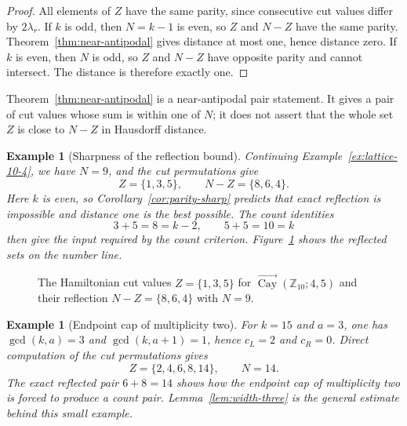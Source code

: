 \documentclass[11pt]{article}
\newtheorem{example}[theorem]{Example}
\newcommand{\Cay}{\overrightarrow{\operatorname{Cay}}}
\newcommand{\Z}{\mathbb Z}
\begin{document}
\begin{proof}
All elements of $Z$ have the same parity, since consecutive cut values differ by $2\lambda_r$.  If $k$ is odd, then $N=k-1$ is even, so $Z$ and $N-Z$ have the same parity.  Theorem~\ref{thm:near-antipodal} gives distance at most one, hence distance zero.  If $k$ is even, then $N$ is odd, so $Z$ and $N-Z$ have opposite parity and cannot intersect.  The distance is therefore exactly one.
\end{proof}

Theorem~\ref{thm:near-antipodal} is a near-antipodal pair statement.  It gives a pair of cut values whose sum is within one of $N$; it does not assert that the whole set $Z$ is close to $N-Z$ in Hausdorff distance.


\begin{example}[Sharpness of the reflection bound]\label{ex:first-family}
Continuing Example~\ref{ex:lattice-10-4}, we have $N=9$, and the cut permutations give
\[
        Z=\{1,3,5\},
        \qquad
        N-Z=\{8,6,4\}.
\]
Here $k$ is even, so Corollary~\ref{cor:parity-sharp} predicts that exact reflection is impossible and distance one is the best possible.  The count identities
\[
        3+5=8=k-2,
        \qquad
        5+5=10=k
\]
then give the input required by the count criterion.  Figure~\ref{fig:near-antipodal-example} shows the reflected sets on the number line.
\end{example}

\begin{figure}[H]
\centering
{}
\caption{The Hamiltonian cut values $Z=\{1,3,5\}$ for $\Cay(\Z_{10};4,5)$ and their reflection $N-Z=\{8,6,4\}$ with $N=9$.}
\label{fig:near-antipodal-example}
\end{figure}

\begin{example}[Endpoint cap of multiplicity two]\label{ex:width-three}
For $k=15$ and $a=3$, one has $\gcd(k,a)=3$ and $\gcd(k,a+1)=1$, hence $c_L=2$ and $c_R=0$.  Direct computation of the cut permutations gives
\[
        Z=\{2,4,6,8,14\},
        \qquad N=14.
\]
The exact reflected pair $6+8=14$ shows how the endpoint cap of multiplicity two is forced to produce a count pair.  Lemma~\ref{lem:width-three} is the general estimate behind this small example.
\end{example}
\end{document}
